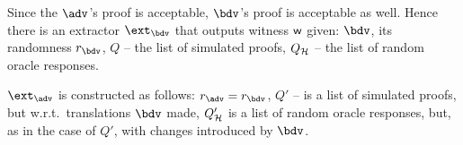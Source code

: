 \documentclass[runningheads,11pt]{llncs}
\begin{document}
Since the $\adv$'s proof is acceptable, $\bdv$'s proof is acceptable as
well. Hence there is an extractor $\ext_\bdv$ that outputs witness $\mathsf{w}$ given:
$\bdv$, its randomness $r_\bdv$, $Q$ -- the list of simulated proofs, $Q_{\mathcal{H}}$ -- the list
of random oracle responses.

$\ext_\adv$ is constructed as follows: $r_\adv = r_\bdv$, $Q'$ -- is a list of
simulated proofs, but w.r.t.~translations $\bdv$ made, $Q'_{\mathcal{H}}$ is a list of
random oracle responses, but, as in the case of $Q'$, with changes introduced by $\bdv$.


\newcommand{\inpa}{\inp_\adv}
\newcommand{\inpb}{\inp_\bdv}
\newcommand{\inps}{\inp_\simulator}
\newcommand{\zkproofa}{\zkproof_\adv}
\newcommand{\zkproofb}{\zkproof_\bdv}
\newcommand{\zkproofs}{\zkproof_\simulator}
\newcommand{\tra}{\trans_\adv}
\newcommand{\trb}{\trans_\bdv}
\end{document}
